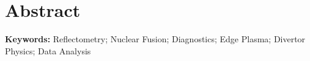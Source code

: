 
\section*{Abstract}



\vfill

\textbf{\Large Keywords:} Reflectometry; Nuclear Fusion;  Diagnostics; Edge Plasma; Divertor Physics; Data Analysis

